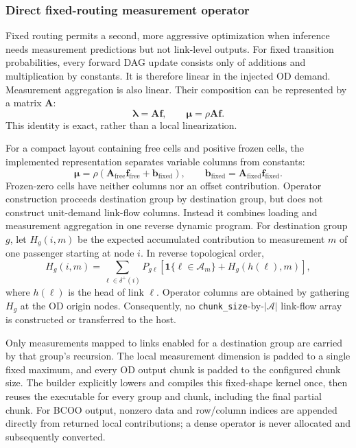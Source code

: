 \subsubsection{Direct fixed-routing measurement operator}

Fixed routing permits a second, more aggressive optimization when inference
needs measurement predictions but not link-level outputs.  For fixed
transition probabilities, every forward DAG update consists only of additions
and multiplication by constants.  It is therefore linear in the injected OD
demand.  Measurement aggregation is also linear.  Their composition can be
represented by a matrix $\bm A$:
\[
\bm\lambda = \bm A\bm f,
\qquad
\bm\mu = \rho\bm A\bm f.
\]
This identity is exact, rather than a local linearization.

For a compact layout containing free cells and positive frozen cells, the
implemented representation separates variable columns from constants:
\[
\bm\mu
=\rho\left(\bm A_{\mathrm{free}}\bm f_{\mathrm{free}}
+\bm b_{\mathrm{fixed}}\right),
\qquad
\bm b_{\mathrm{fixed}}
=\bm A_{\mathrm{fixed}}\bm f_{\mathrm{fixed}}.
\]
Frozen-zero cells have neither columns nor an offset contribution. Operator
construction proceeds destination group by destination group, but does not
construct unit-demand link-flow columns. Instead it combines loading and
measurement aggregation in one reverse dynamic program. For destination group
$g$, let $H_g(i,m)$ be the expected accumulated contribution to measurement
$m$ of one passenger starting at node $i$. In reverse topological order,
\[
H_g(i,m)=
\sum_{\ell\in\delta^+(i)} P_{g\ell}
\left[\mathbf{1}\{\ell\in\mathcal A_m\}+H_g(h(\ell),m)\right],
\]
where $h(\ell)$ is the head of link $\ell$. Operator columns are obtained by
gathering $H_g$ at the OD origin nodes. Consequently, no
\texttt{chunk\_size}-by-$|\mathcal A|$ link-flow array is constructed or
transferred to the host.

Only measurements mapped to links enabled for a destination group are carried
by that group's recursion. The local measurement dimension is padded to a
single fixed maximum, and every OD output chunk is padded to the configured
chunk size. The builder explicitly lowers and compiles this fixed-shape kernel
once, then reuses the executable for every group and chunk, including the final
partial chunk. For BCOO output, nonzero data and row/column indices are appended
directly from returned local contributions; a dense operator is never allocated
and subsequently converted.


